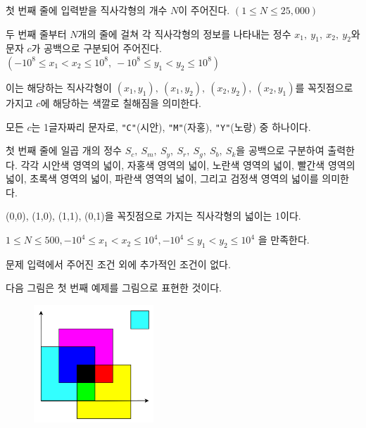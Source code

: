 \begin{problem}{\kcpccymktitle}
    \InputFile
    첫 번째 줄에 입력받을 직사각형의 개수 $ N $이 주어진다. $ (1 \leq N \leq 25,000) $
    
    두 번째 줄부터 $ N $개의 줄에 걸쳐 각 직사각형의 정보를 나타내는 정수 $ x_1,\ y_1,\ x_2,\ y_2 $와 문자 $ c $가 공백으로 구분되어 주어진다. $ (-10^8 \leq x_1 < x_2 \leq 10^8,\ -10^8 \leq y_1 < y_2 \leq 10^8) $
    
    이는 해당하는 직사각형이 $ (x_1, y_1),\ (x_1, y_2),\ (x_2, y_2),\ (x_2, y_1) $를 꼭짓점으로 가지고 $ c $에 해당하는 색깔로 칠해짐을 의미한다.
    
    모든 $ c $는 1글자짜리 문자로, \verb|"C"|(시안), \verb|"M"|(자홍), \verb|"Y"|(노랑) 중 하나이다.
    
    \OutputFile
    첫 번째 줄에 일곱 개의 정수 $ S_c,\ S_m,\ S_y,\ S_r,\ S_g,\ S_b,\ S_k $을 공백으로 구분하여 출력한다. 각각 시안색 영역의 넓이, 자홍색 영역의 넓이, 노란색 영역의 넓이, 빨간색 영역의 넓이, 초록색 영역의 넓이, 파란색 영역의 넓이, 그리고 검정색 영역의 넓이를 의미한다.
    
    (0,0), (1,0), (1,1), (0,1)을 꼭짓점으로 가지는 직사각형의 넓이는 1이다.
    
    
    \SubtaskWithScore{\kcpccymksmallscore}
    $ 1 \leq N \leq 500 , -10^4 \leq x_1 < x_2 \leq 10^4, -10^4 \leq y_1 < y_2 \leq 10^4 $ 을 만족한다.
    
    \SubtaskWithScore{\kcpccymklargescore}
    문제 입력에서 주어진 조건 외에 추가적인 조건이 없다.

    \Examples
    
    \begin{example}
    \end{example}
    
    \Explanation
    다음 그림은 첫 번째 예제를 그림으로 표현한 것이다.
    
    \begin{figure}[h]
        \centering
        \includegraphics[width=0.4\textwidth]{./problems/cymk-ex.png}
    \end{figure}
    
\end{problem}

